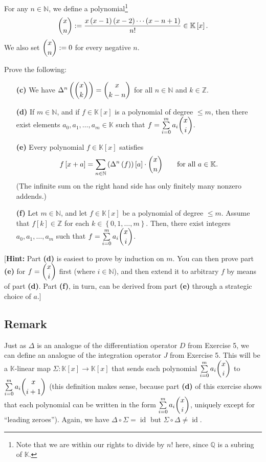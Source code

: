 \documentclass[paper=a4, fontsize=12pt]{scrartcl}%
\let\sumnonlimits\sum
\renewcommand{\sum}{\sumnonlimits\limits}
\theoremstyle{plainsl}
\theoremstyle{definition}
\theoremstyle{remark}
\begin{document}
For any $n \in\mathbb{N}$, we define a polynomial\footnote{Note that we are
within our rights to divide by $n!$ here, since $\mathbb{Q}$ is a subring of
$\mathbb{K}$.}
\[
\dbinom{x}{n} := \dfrac{x\left(  x-1 \right)  \left(  x-2 \right)
\cdots\left(  x-n+1 \right)  }{n!} \in\mathbb{K}\left[  x \right]  .
\]
We also set $\dbinom{x}{n} := 0$ for every negative $n$.

Prove the following:

\begin{enumerate}
\item[\textbf{(c)}] We have $\Delta^{n}\left(  \dbinom{x}{k}\right)
=\dbinom{x}{k-n}$ for all $n\in\mathbb{N}$ and $k\in\mathbb{Z}$.

\item[\textbf{(d)}] If $m \in\mathbb{N}$, and if $f \in\mathbb{K}\left[  x
\right]  $ is a polynomial of degree $\leq m$, then there exist elements
$a_{0}, a_{1}, \ldots, a_{m} \in\mathbb{K}$ such that $f = \sum_{i=0}^{m}
a_{i} \dbinom{x}{i}$.

\item[\textbf{(e)}] Every polynomial $f\in\mathbb{K}\left[  x\right]  $
satisfies
\[
f\left[  x+a\right]  =\sum_{n\in\mathbb{N}}\left(  \Delta^{n}\left(  f\right)
\right)  \left[  a\right]  \cdot\dbinom{x}{n}\qquad\text{for all
$a\in\mathbb{K}$}.
\]
(The infinite sum on the right hand side has only finitely many nonzero addends.)

\item[\textbf{(f)}] Let $m\in\mathbb{N}$, and let $f\in\mathbb{K}\left[
x\right]  $ be a polynomial of degree $\leq m$. Assume that $f\left[
k\right]  \in\mathbb{Z}$ for each $k\in\left\{  0,1,\ldots,m\right\}  $. Then,
there exist integers $a_{0},a_{1},\ldots,a_{m}$ such that $f=\sum_{i=0}%
^{m}a_{i}\dbinom{x}{i}$.
\end{enumerate}

[\textbf{Hint:} Part \textbf{(d)} is easiest to prove by induction on $m$. You
can then prove part \textbf{(e)} for $f = \dbinom{x}{i}$ first (where $i
\in\mathbb{N}$), and then extend it to arbitrary $f$ by means of part
\textbf{(d)}. Part \textbf{(f)}, in turn, can be derived from part
\textbf{(e)} through a strategic choice of $a$.]

\subsection{Remark}

Just as $\Delta$ is an analogue of the differentiation operator $D$ from
Exercise 5, we can define an analogue of the integration operator $J$ from
Exercise 5. This will be a $\mathbb{K}$-linear map $\Sigma: \mathbb{K}\left[
x \right]  \to\mathbb{K}\left[  x \right]  $ that sends each polynomial
$\sum_{i=0}^{m} a_{i} \dbinom{x}{i}$ to $\sum_{i=0}^{m} a_{i} \dbinom{x}{i+1}$
(this definition makes sense, because part \textbf{(d)} of this exercise shows
that each polynomial can be written in the form $\sum_{i=0}^{m} a_{i}
\dbinom{x}{i}$, uniquely except for ``leading zeroes''). Again, we have
$\Delta\circ\Sigma= \operatorname{id}$ but $\Sigma\circ\Delta\neq
\operatorname{id}$.
\end{document}
